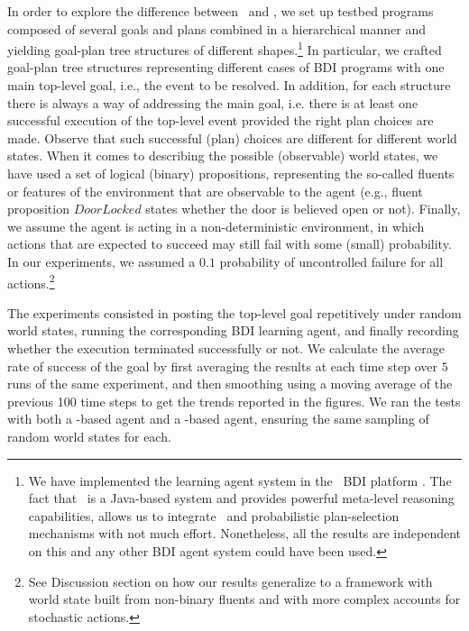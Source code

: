 In order to explore the difference between \BUL\ and \CL, we set up testbed
programs composed of several goals and plans combined in a hierarchical manner
and yielding goal-plan tree structures of different shapes.\footnote{We have
implemented the learning agent system in the \JACK\ BDI platform
\cite{Busetta99jack}. The fact that \JACK\ is a Java-based system and
provides powerful meta-level reasoning capabilities, allows us to integrate \weka\ and
probabilistic plan-selection mechanisms with not much effort. Nonetheless, all
the results are independent on this and any other BDI agent system could
have been used.}
In particular, we crafted goal-plan tree structures representing different
cases of BDI programs with one main top-level goal, i.e., the event to
be resolved. In addition, for each structure there is always a way of addressing the main goal, i.e. there is at
least one successful execution of the top-level event provided the right plan
choices are made. Observe that such successful (plan) choices are different
for different world states.
When it comes to describing the possible (observable) world states, we have used
a set of logical (binary) propositions, representing the so-called fluents or
features of the environment that are observable to the agent (e.g., fluent
proposition $\mathit{DoorLocked}$ states whether the door is believed open or
not).
Finally, we assume the agent is acting in a non-deterministic environment, in
which actions that are expected to succeed may still fail with some (small)
probability. In our experiments, we assumed a $0.1$ probability of
uncontrolled failure for all actions.\footnote{See Discussion section on how our
results generalize to a framework with world state built from non-binary fluents
and with more complex accounts for stochastic actions.}




The experiments consisted in posting the top-level goal repetitively under random
world states, running the corresponding  BDI learning agent, and finally
recording whether the execution terminated successfully or not.
We calculate the average rate of success of the goal by first averaging the
results at each time step over $5$ runs of the same experiment, and then
smoothing using a moving average of the previous 100 time steps to get the trends
reported in the figures.
We ran the tests with both a \BUL-based agent and a \CL-based agent, ensuring the
same sampling of random world states for each.

